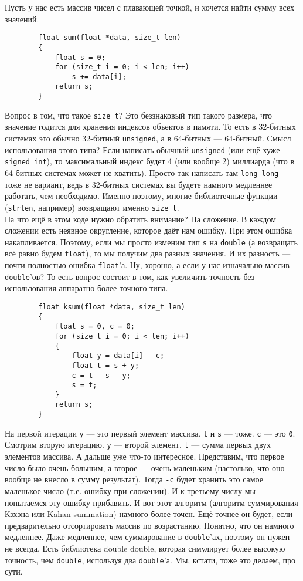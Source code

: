\documentclass{article}
\begin{document}
    Пусть у нас есть массив чисел с плавающей точкой, и хочется найти сумму всех значений.
    \begin{verbatim}
        float sum(float *data, size_t len)
        {
            float s = 0;
            for (size_t i = 0; i < len; i++)
                s += data[i];
            return s;
        }
    \end{verbatim}
    Вопрос в том, что такое \texttt{size_t}? Это беззнаковый тип такого размера, что значение годится для хранения индексов объектов в памяти. То есть в 32-битных системах это обычно 32-битный \texttt{unsigned}, а в 64-битных --- 64-битный. Смысл использования этого типа? Если написать обычный \texttt{unsigned} (или ещё хуже \texttt{signed int}), то максимальный индекс будет 4 (или вообще 2) миллиарда (что в 64-битных системах может не хватить). Просто так написать там \texttt{long long} --- тоже не вариант, ведь в 32-битных системах вы будете намного медленнее работать, чем необходимо. Именно поэтому, многие библиотечные функции (\texttt{strlen}, например) возвращают именно \texttt{size_t}.\\
    На что ещё в этом коде нужно обратить внимание? На сложение. В каждом сложении есть неявное округление, которое даёт нам ошибку. При этом ошибка накапливается. Поэтому, если мы просто изменим тип \texttt{s} на \texttt{double} (а возвращать всё равно будем \texttt{float}), то мы получим два разных значения. И их разность --- почти полностью ошибка \texttt{float}'а. Ну, хорошо, а если у нас изначально массив \texttt{double}'ов? То есть вопрос состоит в том, как увеличить точность без использования аппаратно более точного типа.
    \begin{verbatim}
        float ksum(float *data, size_t len)
        {
            float s = 0, c = 0;            
            for (size_t i = 0; i < len; i++)
            {
                float y = data[i] - c;
                float t = s + y;
                c = t - s - y;
                s = t;
            }
            return s;
        }
    \end{verbatim}
    На первой итерации \texttt{y} --- это первый элемент массива. \texttt{t} и \texttt{s} --- тоже. \texttt{c} --- это \texttt{0}. Смотрим вторую итерацию. \texttt{y} --- второй элемент. \texttt{t} --- сумма первых двух элементов массива. А дальше уже что-то интересное. Представим, что первое число было очень большим, а второе --- очень маленьким (настолько, что оно вообще не внесло в сумму результат). Тогда \texttt{-c} будет хранить это самое маленькое число (т.е. ошибку при сложении). И к третьему числу мы попытаемся эту ошибку прибавить. И вот этот алгоритм (алгоритм суммирования Кэхэна  или Kahan summation) намного более точен. Ещё точнее он будет, если предварительно отсортировать массив по возрастанию. Понятно, что он намного медленнее. Даже медленнее, чем суммирование в \texttt{double}'ах, поэтому он нужен не всегда. Есть библиотека double double, которая симулирует более высокую точность, чем \texttt{double}, используя два \texttt{double}'а. Мы, кстати, тоже это делаем, про сути.\\
\end{document}
